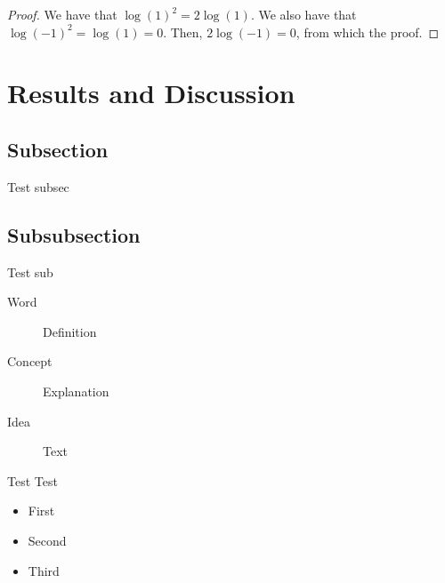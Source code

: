 \documentclass[10pt, 
a4paper, 
oneside, 
headinclude, footinclude, 
BCOR5mm]
{scrartcl}
\begin{document}
\begin{proof}
    We have that $\log(1)^2 = 2\log(1)$.
    We also have that $\log(-1)^2 = \log(1) = 0$.
    Then, $2\log(-1) = 0$, from which the proof.
\end{proof}

\section{Results and Discussion}

\subsection{Subsection}
Test subsec

\subsection{Subsubsection}
Test sub

\begin{description}
    \item[Word] Definition
    \item[Concept] Explanation
    \item[Idea] Text
\end{description}

Test Test

\begin{itemize}[noitemsep]
    \item First
    \item Second
    \item Third
\end{itemize}
\end{document}
